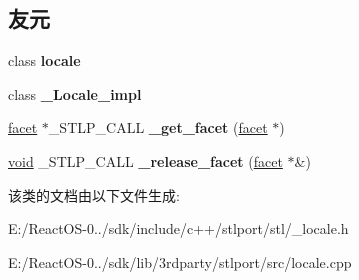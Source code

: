\subsection*{友元}
\begin{DoxyCompactItemize}
\item 
\mbox{\label{classlocale_1_1facet_a0a09223e17db306b813d8b07b4b344fc}} 
class {\bfseries locale}
\item 
\mbox{\label{classlocale_1_1facet_ae9c09ac7cd16ad35f8fdb1587ac77eb8}} 
class {\bfseries \+\_\+\+Locale\+\_\+impl}
\item 
\mbox{\label{classlocale_1_1facet_aa3f3f1652e746958fd60285d475bb72b}} 
\hyperlink{classlocale_1_1facet}{facet} $\ast$\+\_\+\+S\+T\+L\+P\+\_\+\+C\+A\+LL {\bfseries \+\_\+get\+\_\+facet} (\hyperlink{classlocale_1_1facet}{facet} $\ast$)
\item 
\mbox{\label{classlocale_1_1facet_ac22a9112ddf649ca85ea613a29e7dc38}} 
\hyperlink{interfacevoid}{void} \+\_\+\+S\+T\+L\+P\+\_\+\+C\+A\+LL {\bfseries \+\_\+release\+\_\+facet} (\hyperlink{classlocale_1_1facet}{facet} $\ast$\&)
\end{DoxyCompactItemize}


该类的文档由以下文件生成\+:\begin{DoxyCompactItemize}
\item 
E\+:/\+React\+O\+S-\/0../sdk/include/c++/stlport/stl/\+\_\+locale.\+h\item 
E\+:/\+React\+O\+S-\/0../sdk/lib/3rdparty/stlport/src/locale.\+cpp\end{DoxyCompactItemize}
